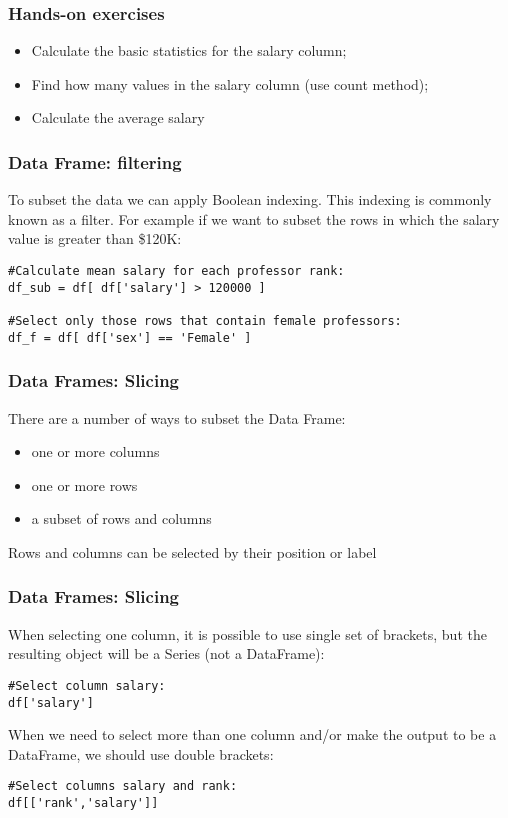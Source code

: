 \begin{frame}[fragile]
\frametitle{Hands-on exercises}
\begin{itemize}
\item Calculate the basic statistics for the salary column;
\item Find how many values in the salary column (use count method);
\item Calculate the average salary
\end{itemize}

\end{frame}


\begin{frame}[fragile]
\frametitle{Data Frame: filtering}
To subset the data we can apply Boolean indexing. This indexing is commonly known as a filter.  For example if we want to subset the rows in which the salary value is greater than \$120K: 

\begin{lstlisting}
#Calculate mean salary for each professor rank:
df_sub = df[ df['salary'] > 120000 ]

#Select only those rows that contain female professors:
df_f = df[ df['sex'] == 'Female' ]
\end{lstlisting}
\end{frame}

\begin{frame}[fragile]
\frametitle{Data Frames: Slicing}
There are a number of ways to subset the Data Frame:

\begin{itemize}
\item one or more columns
\item one or more rows
\item a subset of rows and columns
\end{itemize}
Rows and columns can be selected by their position or label 

\end{frame}


\begin{frame}[fragile]
\frametitle{Data Frames: Slicing}
When selecting one column, it is possible to use single set of brackets, but the resulting object will be  a Series (not a DataFrame): 
\begin{lstlisting}
#Select column salary:
df['salary']
\end{lstlisting}
When we need to select more than one column and/or make the output to be a DataFrame, we should use double brackets:
\begin{lstlisting}
#Select columns salary and rank:
df[['rank','salary']]

\end{lstlisting}
\end{frame}


